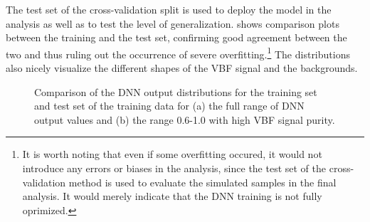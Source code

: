 
The test set of the cross-validation split is used to deploy the model in the analysis as well as to test the level of generalization.
 shows comparison plots between the training and the test set, confirming good agreement between the two and thus ruling out the occurrence of severe overfitting.\footnote{It is worth noting that even if some overfitting occured, it would not introduce any errors or biases in the analysis, since the test set of the cross-validation method is used to evaluate the simulated samples in the final analysis. It would merely indicate that the DNN training is not fully oprimized.}
The distributions also nicely visualize the different shapes of the VBF signal and the backgrounds.
\begin{figure}[t]
    \caption{Comparison of the DNN output distributions for the training set and test set of the training data for (a) the full range of DNN output values and (b) the range 0.6-1.0 with high VBF signal purity.}
    \label{fig:dnn-train-vs-test}
\end{figure}

